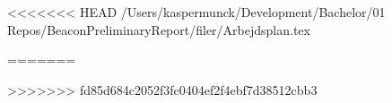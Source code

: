 
\raggedbottom




\tableofcontents



<<<<<<< HEAD
/Users/kaspermunck/Development/Bachelor/01 Repos/BeaconPreliminaryReport/filer/Arbejdsplan.tex

=======



>>>>>>> fd85d684c2052f3fc0404ef2f4ebf7d38512cbb3

